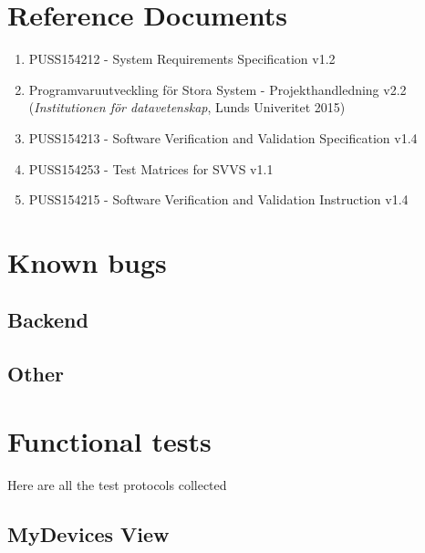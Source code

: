 \documentclass[a4paper]{article}
\begin{document}
\setcounter{tocdepth}{2}
\tableofcontents
\newpage
{}


\section*{Reference Documents}
\begin{enumerate}
\item PUSS154212 - System Requirements Specification v1.2 \label{refdocs:srs} 
\item Programvaruutveckling för Stora System - Projekthandledning v2.2 \newline (\textit{Institutionen för datavetenskap}, Lunds Univeritet 2015) \label{refdocs:projekthandledning}
\item PUSS154213 - Software Verification and Validation Specification v1.4 \label{refdocs:SVVS}
\item PUSS154253 - Test Matrices for SVVS v1.1 \label{refdocs:matrices}
\item PUSS154215 - Software Verification and Validation Instruction v1.4 \label{refdocs:SVVI}
\end{enumerate}

\section{Known bugs}

\subsection{Backend}

\subsection{Other}

\clearpage
\section{Functional tests}
Here are all the test protocols collected

\subsection{MyDevices View}



\end{document}
